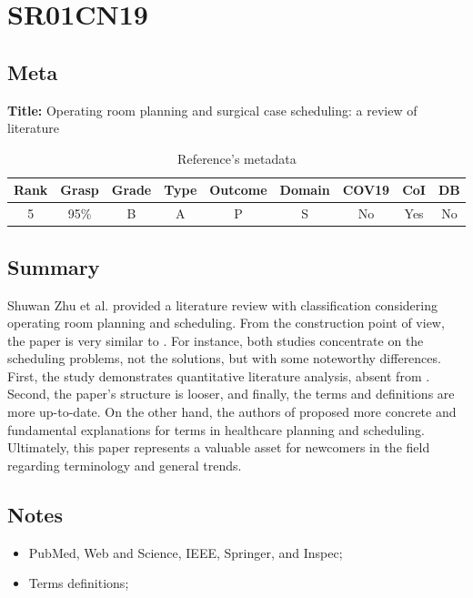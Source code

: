 \section{ SR01CN19 }


\subsection{Meta}

    \textbf{Title:}
    Operating room planning and surgical case scheduling: a review of literature

    \begin{table}[H]
        \centering
        \begin{tabular}{|c|c|c|c|c|c|c|c|c|}
            \hline
                \textbf{Rank} & \textbf{Grasp} & \textbf{Grade} & \textbf{Type} & \textbf{Outcome} & \textbf{Domain} & \textbf{COV19} & \textbf{CoI} & \textbf{DB} \\
            \hline
                5 & 95\% & B & A & P & S & No & Yes & No \\
            \hline
        \end{tabular}
        \caption{Reference's metadata}
        \label{tab:SR01CN19}
    \end{table}

\subsection{Summary}
    Shuwan Zhu et al. \cite{x203} provided a literature review with classification considering operating room planning and scheduling. From the construction point of view, the paper is very similar to \cite{x029}. For instance, both studies concentrate on the scheduling problems, not the solutions, but with some noteworthy differences. First, the study demonstrates quantitative literature analysis, absent from \cite{x029}. Second, the paper's structure is looser, and finally, the terms and definitions are more up-to-date. On the other hand, the authors of \cite{x029} proposed more concrete and fundamental explanations for terms in healthcare planning and scheduling. Ultimately, this paper represents a valuable asset for newcomers in the field regarding terminology and general trends.

\subsection{Notes}
    \begin{itemize}
        \item PubMed, Web and Science, IEEE, Springer, and Inspec;
        \item Terms definitions;
    \end{itemize}


